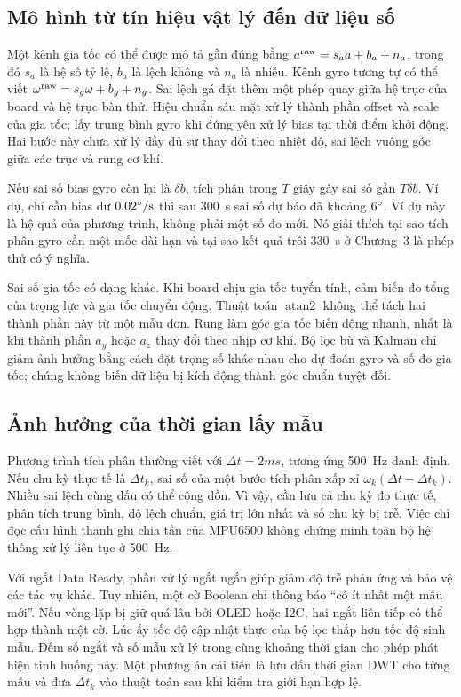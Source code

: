 \subsection{Mô hình từ tín hiệu vật lý đến dữ liệu số}
Một kênh gia tốc có thể được mô tả gần đúng bằng $a^{\rm raw}=s_a a+b_a+n_a$, trong đó $s_a$ là hệ số tỷ lệ, $b_a$ là lệch không và $n_a$ là nhiễu. Kênh gyro tương tự có thể viết $\omega^{\rm raw}=s_g\omega+b_g+n_g$. Sai lệch gá đặt thêm một phép quay giữa hệ trục của board và hệ trục bàn thử. Hiệu chuẩn sáu mặt xử lý thành phần offset và scale của gia tốc; lấy trung bình gyro khi đứng yên xử lý bias tại thời điểm khởi động. Hai bước này chưa xử lý đầy đủ sự thay đổi theo nhiệt độ, sai lệch vuông góc giữa các trục và rung cơ khí.

Nếu sai số bias gyro còn lại là $\delta b$, tích phân trong $T$ giây gây sai số gần $T\delta b$. Ví dụ, chỉ cần bias dư $0{,}02^{\circ}/\mathrm{s}$ thì sau 300~s sai số dự báo đã khoảng $6^{\circ}$. Ví dụ này là hệ quả của phương trình, không phải một số đo mới. Nó giải thích tại sao tích phân gyro cần một mốc dài hạn và tại sao kết quả trôi 330~s ở Chương~3 là phép thử có ý nghĩa.

Sai số gia tốc có dạng khác. Khi board chịu gia tốc tuyến tính, cảm biến đo tổng của trọng lực và gia tốc chuyển động. Thuật toán $\operatorname{atan2}$ không thể tách hai thành phần này từ một mẫu đơn. Rung làm góc gia tốc biến động nhanh, nhất là khi thành phần $a_y$ hoặc $a_z$ thay đổi theo nhịp cơ khí. Bộ lọc bù và Kalman chỉ giảm ảnh hưởng bằng cách đặt trọng số khác nhau cho dự đoán gyro và số đo gia tốc; chúng không biến dữ liệu bị kích động thành góc chuẩn tuyệt đối.

\subsection{Ảnh hưởng của thời gian lấy mẫu}
Phương trình tích phân thường viết với $\Delta t=2\unit{ms}$, tương ứng 500~Hz danh định. Nếu chu kỳ thực tế là $\Delta t_k$, sai số của một bước tích phân xấp xỉ $\omega_k(\Delta t-\Delta t_k)$. Nhiều sai lệch cùng dấu có thể cộng dồn. Vì vậy, cần lưu cả chu kỳ đo thực tế, phân tích trung bình, độ lệch chuẩn, giá trị lớn nhất và số chu kỳ bị trễ. Việc chỉ đọc cấu hình thanh ghi chia tần của MPU6500 không chứng minh toàn bộ hệ thống xử lý liên tục ở 500~Hz.

Với ngắt Data Ready, phần xử lý ngắt ngắn giúp giảm độ trễ phản ứng và bảo vệ các tác vụ khác. Tuy nhiên, một cờ Boolean chỉ thông báo ``có ít nhất một mẫu mới''. Nếu vòng lặp bị giữ quá lâu bởi OLED hoặc I2C, hai ngắt liên tiếp có thể hợp thành một cờ. Lúc ấy tốc độ cập nhật thực của bộ lọc thấp hơn tốc độ sinh mẫu. Đếm số ngắt và số mẫu xử lý trong cùng khoảng thời gian cho phép phát hiện tình huống này. Một phương án cải tiến là lưu dấu thời gian DWT cho từng mẫu và đưa $\Delta t_k$ vào thuật toán sau khi kiểm tra giới hạn hợp lệ.

